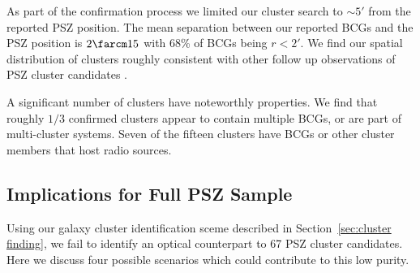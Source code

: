 \documentclass[apj, revtex4-1]{emulateapj}
\begin{document}
As part of the confirmation process we limited our cluster search to $\sim$$5'$ from the reported PSZ position. The mean separation between our reported BCGs and the PSZ position is $2\farcm15$ with 68\% of BCGs being $r < 2'$. We find our spatial distribution of clusters roughly consistent with other follow up observations of PSZ cluster candidates .

A significant number of clusters have noteworthly properties. We find that roughly $1/3$ confirmed clusters appear to contain multiple BCGs, or are part of multi-cluster systems. Seven of the fifteen clusters have BCGs or other cluster members that host radio sources.


\subsection{Implications for Full PSZ Sample}
Using our galaxy cluster identification sceme described in Section~\ref{sec:cluster finding}, we fail to identify an optical counterpart to 67 PSZ cluster candidates. Here we discuss four possible scenarios which could contribute to this low purity.
\end{document}
